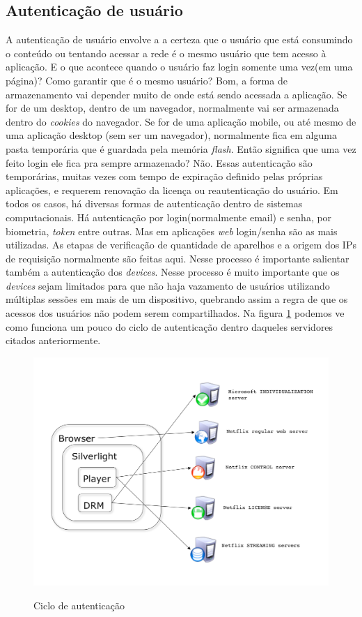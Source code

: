 \subsection{Autentica\c{c}\~ao de usu\'ario}
\label{subsection:autenticacao_usuario}
A autentica\c{c}\~ao de usu\'ario envolve a a certeza que o usu\'ario que est\'a consumindo o conte\'udo ou tentando acessar a rede \'e o mesmo usu\'ario que tem acesso \`a aplica\c{c}\~ao. E o que acontece quando o usu\'ario faz login somente uma vez(em uma p\'agina)? Como garantir que \'e o mesmo usu\'ario?
\newline
Bom, a forma de armazenamento vai depender muito de onde est\'a sendo acessada a aplica\c{c}\~ao. Se for de um desktop, dentro de um navegador, normalmente vai ser armazenada dentro do \textit{cookies} do navegador. Se for de uma aplica\c{c}\~ao mobile, ou at\'e mesmo de uma aplica\c{c}\~ao desktop (sem ser um navegador), normalmente fica em alguma pasta tempor\'aria que \'e guardada pela mem\'oria \textit{flash}. Ent\~ao significa que uma vez feito login ele fica pra sempre armazenado?
\newline
N\~ao. Essas autentica\c{c}\~ao s\~ao tempor\'arias, muitas vezes com tempo de expira\c{c}\~ao definido pelas pr\'oprias aplica\c{c}\~oes, e requerem renova\c{c}\~ao da licen\c{c}a ou reautentica\c{c}\~ao do usu\'ario. 
\newline
Em todos os casos, h\'a diversas formas de autentica\c{c}\~ao dentro de sistemas computacionais. H\'a autentica\c{c}\~ao por login(normalmente email) e senha, por biometria, \textit{token} entre outras. Mas em aplica\c{c}\~oes \textit{web} login/senha s\~ao as mais utilizadas.
\newline
As etapas de verifica\c{c}\~ao de quantidade de aparelhos e a origem dos IPs de requisi\c{c}\~ao normalmente s\~ao feitas aqui.
\newline
Nesse processo \'e importante salientar tamb\'em a autentica\c{c}\~ao dos \textit{devices}. Nesse processo \'e muito importante que os \textit{devices} sejam limitados para que n\~ao haja vazamento de usu\'arios utilizando m\'ultiplas sess\~oes em mais de um dispositivo, quebrando assim a regra de que os acessos dos usu\'arios n\~ao podem serem compartilhados.
\newline
Na figura \ref{figura:autenticacao_conteudo} podemos ve como funciona um pouco do ciclo de autentica\c{c}\~ao dentro daqueles servidores citados anteriormente.
\begin{figure}[H]
\caption{Ciclo de autentica\c{c}\~ao}
\includegraphics[width=14cm]{Figuras/autenticacao_conteudo.png} 
\label{figura:autenticacao_conteudo}
\end{figure}